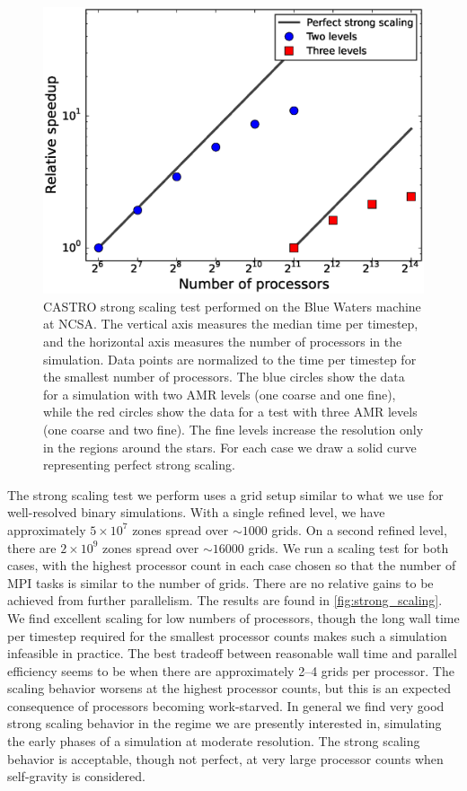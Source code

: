\documentclass[iop]{../emulateapj}
\begin{document}
\begin{figure}
  \centering
  \includegraphics[scale=0.4]{plots/strong_scaling}
  \caption{CASTRO strong scaling test performed on the Blue Waters machine at
    NCSA. The vertical axis measures the median time per timestep, and the 
    horizontal axis measures the number of processors in the simulation. Data 
    points are normalized to the time per timestep for the smallest number 
    of processors. The blue circles show the data for a simulation with two AMR
    levels (one coarse and one fine), while the red circles show the data 
    for a test with three AMR levels (one coarse and two fine). The fine levels 
    increase the resolution only in the regions around the stars. For each case 
    we draw a solid curve representing perfect strong scaling.\label{fig:strong_scaling}}
\end{figure}

The strong scaling test we perform uses a grid setup similar to what we 
use for well-resolved binary simulations. With a single refined level, 
we have approximately $5 \times 10^7$ zones spread over $\sim 1000$ grids.
On a second refined level, there are $2 \times 10^9$ zones spread over 
$\sim 16000$ grids. We run a scaling test for both cases, with the 
highest processor count in each case chosen so that the number of 
MPI tasks is similar to the number of grids. There are no relative gains 
to be achieved from further parallelism. The results are found in 
\autoref{fig:strong_scaling}. We find excellent scaling for low numbers 
of processors, though the long wall time per timestep required for the 
smallest processor counts makes such a simulation infeasible in practice.
The best tradeoff between reasonable wall time and parallel efficiency 
seems to be when there are approximately 2--4 grids per processor. The 
scaling behavior worsens at the highest processor counts, but this is 
an expected consequence of processors becoming work-starved. In general 
we find very good strong scaling behavior in the regime we are presently 
interested in, simulating the early phases of a simulation at moderate 
resolution. The strong scaling behavior is acceptable, though not perfect, 
at very large processor counts when self-gravity is considered.
\end{document}
